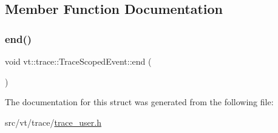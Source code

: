 \subsection{Member Function Documentation}
\mbox{\label{structvt_1_1trace_1_1_trace_scoped_event_af1c826007629d7a7ec77070cca809697}} 
\subsubsection{\texorpdfstring{end()}{end()}}
{\footnotesize\ttfamily void vt\+::trace\+::\+Trace\+Scoped\+Event\+::end (\begin{DoxyParamCaption}{ }\end{DoxyParamCaption})\hspace{0.3cm}{\ttfamily [inline]}}



The documentation for this struct was generated from the following file\+:\begin{DoxyCompactItemize}
\item 
src/vt/trace/\hyperlink{trace__user_8h}{trace\+\_\+user.\+h}\end{DoxyCompactItemize}
